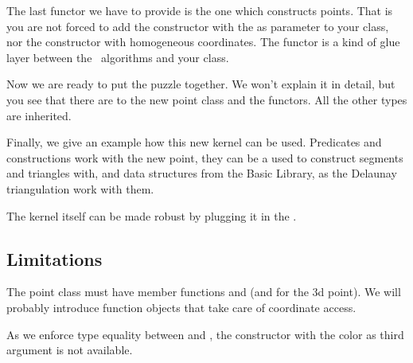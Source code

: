 
The last functor we have to provide is the one which constructs
points. That is you are not forced to add the constructor 
with the  as parameter to your class, nor the constructor with 
homogeneous coordinates.
The functor is a kind of glue layer between the \cgal\ algorithms
and your class.


Now we are ready to put the puzzle together. We won't explain it in
detail, but you see that there are  to the new point
class and the functors. All the other types are inherited.


Finally, we give an example how this new kernel can be used.
Predicates and constructions work with the new point, they
can be a used to construct segments and triangles with, and
data structures from the Basic Library, as the Delaunay
triangulation work with them.  

The kernel itself can be
made robust by plugging it in the .




\subsection{Limitations}

The point class must have member functions  and 
(and  for the 3d point). We will probably
introduce function objects that take care of coordinate
access.


As we enforce type equality between  and ,
the constructor with the color as third argument is not available.









